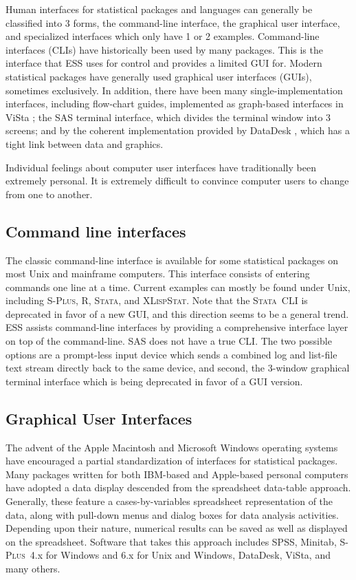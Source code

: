 \documentclass{article}
\newcommand*{\Splus}{\textsc{S-Plus}}
\newcommand*{\XLispStat}{\textsc{XLispStat}}
\newcommand*{\Stata}{\textsc{Stata}}
\begin{document}
Human interfaces for statistical packages and languages can generally
be classified into 3 forms, the command-line interface, the graphical
user interface, and specialized interfaces which only have 1 or 2
examples.  Command-line interfaces (CLIs) have historically been used
by many packages.  This is the interface that ESS uses for control and
provides a limited GUI for.  Modern statistical packages have
generally used graphical user interfaces (GUIs), sometimes
exclusively.  In addition, there have been many single-implementation
interfaces, including flow-chart guides, implemented as graph-based
interfaces in ViSta \citep{youn:lubi:1995}; the SAS terminal
interface, which divides the terminal window into 3 screens; and by
the coherent implementation provided by DataDesk
\citep{vell:prat:1989}, which has a tight link between data and
graphics.

Individual feelings about computer user interfaces have traditionally
been extremely personal.  It is extremely difficult to convince
computer users to change from one to another.  

\subsection{Command line interfaces}
\label{sec:UI:command}

The classic command-line interface is available for some statistical
packages on most Unix and mainframe computers.  This interface
consists of entering commands one line at a time.  Current examples
can mostly be found under Unix, including \Splus, R, \Stata, and
\XLispStat.  Note that the \Stata\ CLI is deprecated in favor of a new
GUI, and this direction seems to be a general trend.  ESS assists
command-line interfaces by providing a comprehensive interface layer
on top of the command-line.  SAS does not have a true CLI.  The two
possible options are a prompt-less input device which sends a combined
log and list-file text stream directly back to the same device, and
second, the 3-window graphical terminal interface which is being
deprecated in favor of a GUI version.

\subsection{Graphical User Interfaces}
\label{sec:UI:GUI}

The advent of the Apple Macintosh and Microsoft Windows operating
systems have encouraged a partial standardization of interfaces for
statistical packages.  Many packages written for both IBM-based and
Apple-based personal computers have adopted a data display descended
from the spreadsheet data-table approach.  Generally, these feature a
cases-by-variables spreadsheet representation of the data, along with
pull-down menus and dialog boxes for data analysis activities.
Depending upon their nature, numerical results can be saved as well as
displayed on the spreadsheet.  Software that takes this approach
includes SPSS, Minitab, \Splus\ 4.x for Windows and 6.x for Unix and
Windows, DataDesk, ViSta, and many others.
\end{document}
